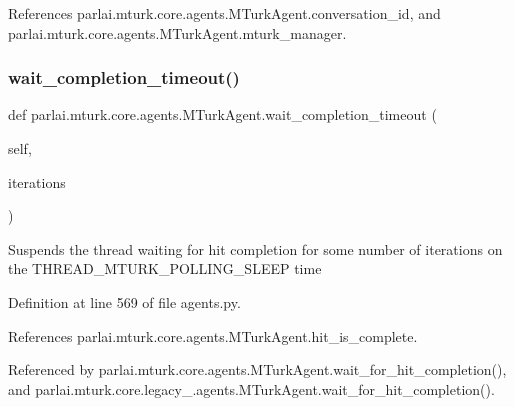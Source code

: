 References parlai.\+mturk.\+core.\+agents.\+M\+Turk\+Agent.\+conversation\+\_\+id, and parlai.\+mturk.\+core.\+agents.\+M\+Turk\+Agent.\+mturk\+\_\+manager.

\mbox{\label{classparlai_1_1mturk_1_1core_1_1agents_1_1MTurkAgent_a16eafd62a6d60317de9098405f786180}} 
\subsubsection{\texorpdfstring{wait\+\_\+completion\+\_\+timeout()}{wait\_completion\_timeout()}}
{\footnotesize\ttfamily def parlai.\+mturk.\+core.\+agents.\+M\+Turk\+Agent.\+wait\+\_\+completion\+\_\+timeout (\begin{DoxyParamCaption}\item[{}]{self,  }\item[{}]{iterations }\end{DoxyParamCaption})}

\begin{DoxyVerb}Suspends the thread waiting for hit completion for some number of
iterations on the THREAD_MTURK_POLLING_SLEEP time\end{DoxyVerb}
 

Definition at line 569 of file agents.\+py.



References parlai.\+mturk.\+core.\+agents.\+M\+Turk\+Agent.\+hit\+\_\+is\+\_\+complete.



Referenced by parlai.\+mturk.\+core.\+agents.\+M\+Turk\+Agent.\+wait\+\_\+for\+\_\+hit\+\_\+completion(), and parlai.\+mturk.\+core.\+legacy\+\_.\+agents.\+M\+Turk\+Agent.\+wait\+\_\+for\+\_\+hit\+\_\+completion().

